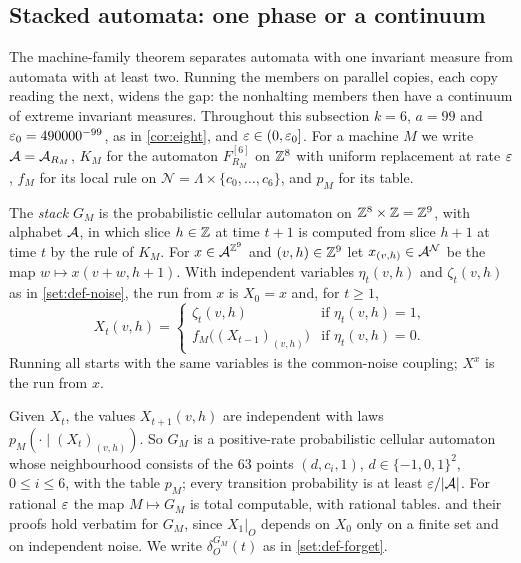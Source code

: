 \subsection{Stacked automata: one phase or a continuum}\label{pf:sec-stack}

The machine-family theorem separates automata with one invariant measure from automata with at least two. Running the members on parallel copies, each copy reading the next, widens the gap: the nonhalting members then have a continuum of extreme invariant measures. Throughout this subsection $k=6$, $a=99$ and $\varepsilon_0=490000^{-99}$, as in \cref{cor:eight}, and $\varepsilon\in(0,\varepsilon_0]$. For a machine $M$ we write $\mathcal{A}=\mathcal{A}_{R_M}$, $K_M$ for the automaton $F^{[6]}_{R_M}$ on $\mathbb{Z}^8$ with uniform replacement at rate $\varepsilon$, $f_M$ for its local rule on $\mathcal N=\Lambda\times\{c_0,\dots,c_6\}$, and $p_M$ for its table.

\begin{definition}\label{pf:def-stack}
The \emph{stack} $G_M$ is the probabilistic cellular automaton on $\mathbb{Z}^8\times\mathbb{Z}=\mathbb{Z}^9$, with alphabet $\mathcal{A}$, in which slice $h\in\mathbb{Z}$ at time $t+1$ is computed from slice $h+1$ at time $t$ by the rule of $K_M$. For $x\in\mathcal{A}^{\mathbb{Z}^9}$ and $(v,h)\in\mathbb{Z}^9$ let $x_{(v,h)}\in\mathcal{A}^{\mathcal N}$ be the map $w\mapsto x(v+w,h+1)$. With independent variables $\eta_t(v,h)$ and $\zeta_t(v,h)$ as in \cref{set:def-noise}, the run from $x$ is $X_0=x$ and, for $t\ge1$,
\[
X_t(v,h)=\begin{cases}\zeta_t(v,h)&\text{if }\eta_t(v,h)=1,\\ f_M\bigl((X_{t-1})_{(v,h)}\bigr)&\text{if }\eta_t(v,h)=0.\end{cases}
\]
Running all starts with the same variables is the common-noise coupling; $X^x$ is the run from $x$.
\end{definition}

Given $X_t$, the values $X_{t+1}(v,h)$ are independent with laws $p_M(\cdot\mid(X_t)_{(v,h)})$. So $G_M$ is a positive-rate probabilistic cellular automaton whose neighbourhood consists of the $63$ points $(d,c_i,1)$, $d\in\{-1,0,1\}^2$, $0\le i\le6$, with the table $p_M$; every transition probability is at least $\varepsilon/|\mathcal{A}|$. For rational $\varepsilon$ the map $M\mapsto G_M$ is total computable, with rational tables.  and their proofs hold verbatim for $G_M$, since $X_1|_O$ depends on $X_0$ only on a finite set and on independent noise. We write $\delta^{G_M}_O(t)$ as in \cref{set:def-forget}.

